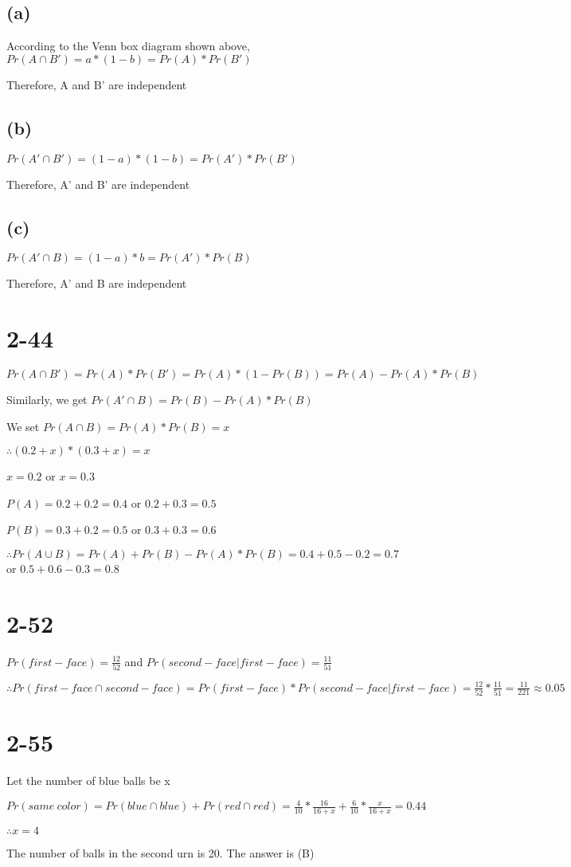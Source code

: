 \documentclass[12pt]{article}
\begin{document}
\begin{spacing}{2.0}
\subsection*{(a)}
According to the Venn box diagram shown above, $Pr(A\cap B')=a*(1-b) =Pr(A)*Pr(B')$

Therefore, A and B' are independent

\subsection*{(b)}
$Pr(A'\cap B')=(1-a)*(1-b)= Pr(A')*Pr(B')$

Therefore, A' and B' are independent

\subsection*{(c)}
$Pr(A' \cap B)=(1-a)*b= Pr(A')*Pr(B)$

Therefore, A' and B are independent

\section*{2-44}
$Pr(A\cap B')=Pr(A)*Pr(B')=Pr(A)*(1-Pr(B))=Pr(A)-Pr(A)*Pr(B)$

Similarly, we get $Pr(A'\cap B)=Pr(B)-Pr(A)*Pr(B)$

We set $Pr(A\cap B)=Pr(A)*Pr(B)=x$

$\therefore (0.2+x)*(0.3+x)=x$

$x=0.2$ or $x=0.3$

$P(A)=0.2+0.2=0.4$ or $0.2+0.3=0.5$

$P(B)=0.3+0.2=0.5$ or $0.3+0.3=0.6$

$\therefore Pr(A\cup B)=Pr(A)+Pr(B)-Pr(A)*Pr(B)=0.4+0.5-0.2= 0.7$ or $0.5+0.6-0.3=0.8$

\section*{2-52}
$Pr(first-face)=\frac{12}{52}$ and $Pr(second-face|first-face)=\frac{11}{51}$

$\therefore Pr(first-face\cap second-face)= Pr(first-face)* Pr(second-face|first-face)= \frac{12}{52}* \frac{11}{51}= \frac{11}{221}\approx 0.05$

\section*{2-55}
Let the number of blue balls be x

$Pr(same\ color)=Pr(blue \cap blue)+ Pr(red\cap red)= \frac{4}{10}*\frac{16}{16+x}+\frac{6}{10}*\frac{x}{16+x}=0.44$

$\therefore x=4$

The number of balls in the second urn is 20. The answer is (B)

\end{spacing}
\end{document}
